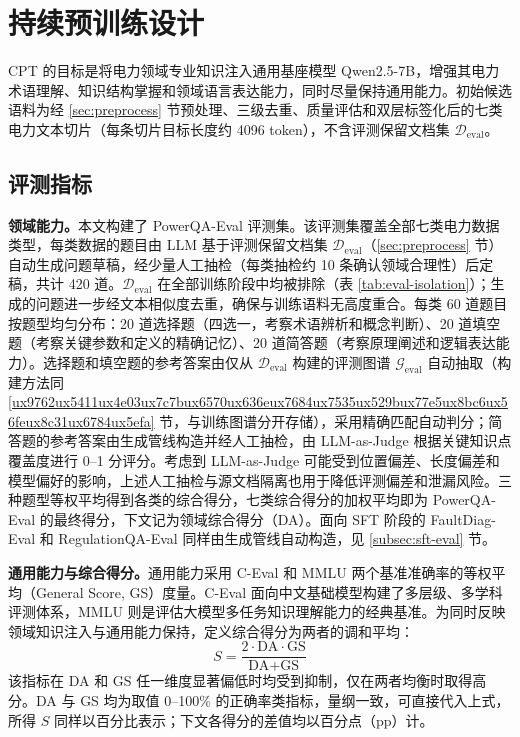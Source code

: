 \documentclass[fontset=fandol,type=master,campus=shenzhen,etitleauto=true]{hithesisbook}
\begin{document}
\section{持续预训练设计}\label{sec:cpt}

CPT 的目标是将电力领域专业知识注入通用基座模型 Qwen2.5-7B\cite{ref55}，增强其电力术语理解、知识结构掌握和领域语言表达能力，同时尽量保持通用能力。初始候选语料为经 \ref{sec:preprocess} 节预处理、三级去重、质量评估和双层标签化后的七类电力文本切片（每条切片目标长度约 4096 token），不含评测保留文档集 $\mathcal{D}_{\text{eval}}$。

\subsection{评测指标}\label{subsec:cpt-eval}

\textbf{领域能力。}本文构建了 PowerQA-Eval 评测集。该评测集覆盖全部七类电力数据类型，每类数据的题目由 LLM 基于评测保留文档集 $\mathcal{D}_{\text{eval}}$（\ref{sec:preprocess} 节）自动生成问题草稿，经少量人工抽检（每类抽检约 10 条确认领域合理性）后定稿，共计 420 道。$\mathcal{D}_{\text{eval}}$ 在全部训练阶段中均被排除（表 \ref{tab:eval-isolation}）；生成的问题进一步经文本相似度去重，确保与训练语料无高度重合。每类 60 道题目按题型均匀分布：20 道选择题（四选一，考察术语辨析和概念判断）、20 道填空题（考察关键参数和定义的精确记忆）、20 道简答题（考察原理阐述和逻辑表达能力）。选择题和填空题的参考答案由仅从 $\mathcal{D}_{\text{eval}}$ 构建的评测图谱 $\mathcal{G}_{\text{eval}}$ 自动抽取（构建方法同 \ref{ux9762ux5411ux4e03ux7c7bux6570ux636eux7684ux7535ux529bux77e5ux8bc6ux56feux8c31ux6784ux5efa} 节，与训练图谱分开存储），采用精确匹配自动判分；简答题的参考答案由生成管线构造并经人工抽检，由 LLM-as-Judge 根据关键知识点覆盖度进行 0--1 分评分。考虑到 LLM-as-Judge 可能受到位置偏差、长度偏差和模型偏好的影响\cite{ref65}，上述人工抽检与源文档隔离也用于降低评测偏差和泄漏风险。三种题型等权平均得到各类的综合得分，七类综合得分的加权平均即为 PowerQA-Eval 的最终得分，下文记为领域综合得分（DA）。面向 SFT 阶段的 FaultDiag-Eval 和 RegulationQA-Eval 同样由生成管线自动构造，见 \ref{subsec:sft-eval} 节。

\textbf{通用能力与综合得分。}通用能力采用 C-Eval 和 MMLU 两个基准准确率的等权平均（General Score, GS）度量。C-Eval 面向中文基础模型构建了多层级、多学科评测体系\cite{ref66}，MMLU 则是评估大模型多任务知识理解能力的经典基准\cite{ref67}。为同时反映领域知识注入与通用能力保持，定义综合得分为两者的调和平均：
\begin{equation}
S = \frac{2 \cdot \text{DA} \cdot \text{GS}}{\text{DA} + \text{GS}}
\end{equation}
该指标在 DA 和 GS 任一维度显著偏低时均受到抑制，仅在两者均衡时取得高分。DA 与 GS 均为取值 0--100\% 的正确率类指标，量纲一致，可直接代入上式，所得 $S$ 同样以百分比表示；下文各得分的差值均以百分点（pp）计。
\end{document}
